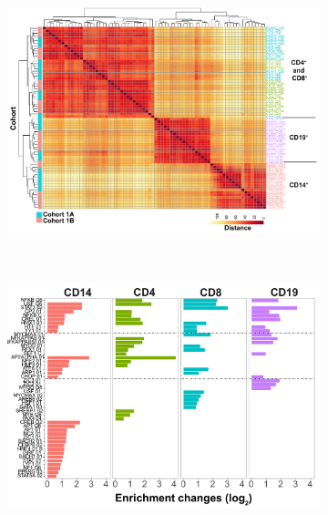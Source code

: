 \bigskip
\begin{figure}[htbp]
\centering
\begin{subfigure}[b]{0.7\textwidth}
\centering 
\includegraphics[width=\textwidth]{./Results2/pdfs/ATAC_all_cell_types_heatmap_with_batch_annotation}
\caption{}
\end{subfigure}
~
\begin{subfigure}[b]{0.7\textwidth} 
\centering
\includegraphics[width=\textwidth]{./Results2/pdfs/ATAC_PS_CTL_cell_type_specific_master_list_conserved_TFBS_enrichment}
\caption{}
\end{subfigure}

\end{figure}
